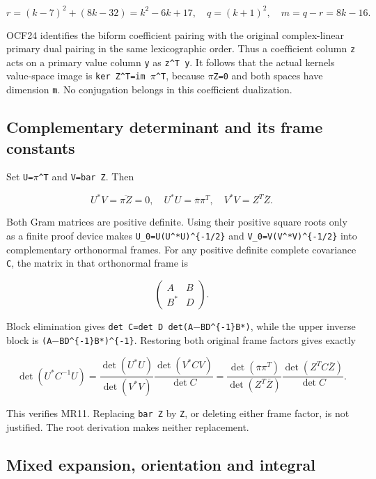 \[
r=(k-7)^2+(8k-32)=k^2-6k+17,
\quad q=(k+1)^2,
\quad m=q-r=8k-16.
\]

OCF24 identifies the biform coefficient pairing with the original complex-linear primary dual pairing in the same lexicographic order. Thus a coefficient column \texttt{z} acts on a primary value column \texttt{y} as \texttt{z\^{}T\ y}. It follows that the actual kernel\textquotesingle s value-space image is \texttt{ker\ Z\^{}T=im\ \ensuremath{\pi}\^{}T}, because \texttt{\ensuremath{\pi}Z=0} and both spaces have dimension \texttt{m}. No conjugation belongs in this coefficient dualization.

\subsection{Complementary determinant and its frame constants}\label{mrreview:complementary-determinant-and-its-frame-constants}

Set \texttt{U=\ensuremath{\pi}\^{}T} and \texttt{V=bar\ Z}. Then

\[
U^*V=\overline{\pi Z}=0,
\quad U^*U=\overline\pi\pi^T,
\quad V^*V=Z^T\overline Z.
\]

Both Gram matrices are positive definite. Using their positive square roots only as a finite proof device makes \texttt{U\_0=U(U\^{}*U)\^{}\{-1/2\}} and \texttt{V\_0=V(V\^{}*V)\^{}\{-1/2\}} into complementary orthonormal frames. For any positive definite complete covariance \texttt{C}, the matrix in that orthonormal frame is

\[
\begin{pmatrix}A&B\\B^*&D\end{pmatrix}.
\]

Block elimination gives \texttt{det\ C=det\ D\ det(A\ensuremath{-}BD\^{}\{-1\}B*)}, while the upper inverse block is \texttt{(A\ensuremath{-}BD\^{}\{-1\}B*)\^{}\{-1\}}. Restoring both original frame factors gives exactly

\[
\det(U^*C^{-1}U)
=\frac{\det(U^*U)}{\det(V^*V)}
  \frac{\det(V^*CV)}{\det C}
=\frac{\det(\overline\pi\pi^T)}{\det(Z^T\overline Z)}
  \frac{\det(Z^TC\overline Z)}{\det C}.
\]

This verifies MR11. Replacing \texttt{bar\ Z} by \texttt{Z}, or deleting either frame factor, is not justified. The root derivation makes neither replacement.

\subsection{Mixed expansion, orientation and integral}\label{mrreview:mixed-expansion-orientation-and-integral}

